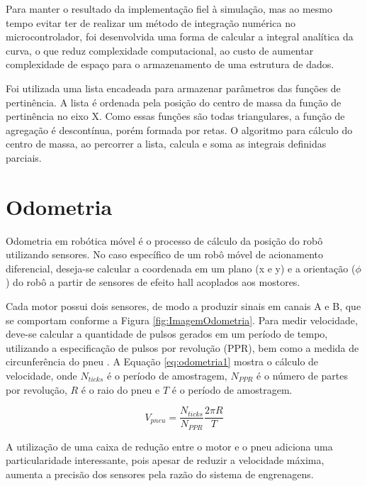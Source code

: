 	Para manter o resultado da implementação fiel à simulação, mas ao mesmo tempo evitar ter 
	de realizar um método de integração numérica no microcontrolador, foi desenvolvida uma forma
	de calcular a integral analítica da curva, o que reduz complexidade computacional, ao custo
	de aumentar complexidade de espaço para o armazenamento de uma estrutura de dados. 
	
	Foi utilizada uma lista encadeada para armazenar parâmetros das funções de pertinência. 
	A lista é ordenada pela posição do centro de massa da função de pertinência no eixo X. Como 
	essas funções são todas triangulares, a função de agregação é descontínua, porém formada por 
	retas. O algoritmo para cálculo do centro de massa, ao percorrer a lista, calcula e soma 
	as integrais definidas parciais. 
	
\section{Odometria}

Odometria em robótica móvel é o processo de cálculo da posição do robô
utilizando sensores. No caso específico de um robô móvel de acionamento
diferencial, deseja-se calcular a coordenada em um plano (x e y) e a 
orientação ($\phi$) do robô a partir de sensores de efeito hall acoplados
aos mostores. \cite{art:odometria1}

Cada motor possui dois sensores, de modo a produzir sinais em canais 
A e B, que se comportam conforme a Figura \ref{fig:ImagemOdometria}. Para medir velocidade, 
deve-se  calcular a quantidade de pulsos gerados em um período de tempo,
utilizando a especificação de pulsos por revolução (PPR), bem como a
medida de circunferência do pneu \cite{odometria2}. A Equação 
\ref{eq:odometria1} mostra o cálculo de velocidade, onde $N_{ticks}$
é o período de amostragem, $N_{PPR}$ é o número de partes por revolução,
$R$ é o raio do pneu e $T$ é o período de amostragem.



\begin{equation}
	\label{eq:odometria1}
	V_{pneu} = \frac{N_{ticks}}{N_{PPR}} \frac{2\pi R}{T}
\end{equation}

A utilização de uma caixa de redução entre o motor e o pneu adiciona
uma particularidade interessante, pois apesar de reduzir a velocidade
máxima, aumenta a precisão dos sensores pela razão do sistema de 
engrenagens. 
	
